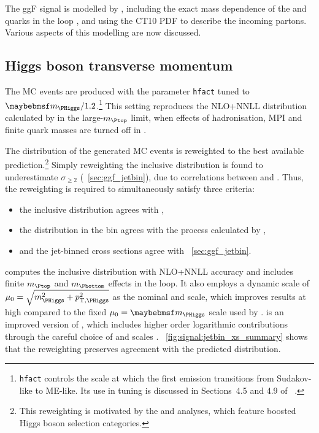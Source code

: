 
The ggF signal is modelled by , including the exact mass 
dependence of the \Ptop and \Pbottom quarks in the loop \cite{Powheg-ggF-quarkmasses}, and 
using the CT10 PDF \cite{CTEQ} to describe the incoming partons. Various aspects of this 
modelling are now discussed.



\subsection{Higgs boson transverse momentum}
\label{sec:ggF:pt}

The MC events are produced with the \powhegbox parameter \verb|hfact| tuned to 
$\mH/1.2$.\footnote{
	\texttt{hfact} controls the scale at which the first emission transitions from 
	Sudakov-like to ME-like. Its use in tuning \ptH is discussed in Sections~4.5 and 4.9 of 
	\Reference~\cite{YR2}.
}
This setting reproduces the NLO+NNLL \ptH distribution calculated by \hqt \cite{HqT2} in 
the large-$m_{\Ptop}$ limit, when effects of hadronisation, MPI and finite quark masses are 
turned off in .

The \ptH distribution of the generated MC events is reweighted to the best available 
prediction.\footnote{
	This \ptH reweighting is motivated by the \HepProcess{\PHiggs \HepTo \Pphoton\Pphoton} 
	and \HepProcess{\PHiggs \HepTo \Ptau\Ptau} analyses, which feature boosted Higgs boson 
	selection categories.
}
Simply reweighting the inclusive \ptH distribution is found to underestimate $\sigma_{\geq2}$
(\cf \Section~\ref{sec:ggf_jetbin}), due to correlations between \ptH and \njets. 
Thus, the reweighting is required to simultaneously satisfy three criteria:
\begin{itemize}[noitemsep,nolistsep]
	\item the inclusive \ptH distribution agrees with \hres \cite{HRes},
	\item the \ptH distribution in the \twojet bin agrees with the 
	 process calculated by 
	 \cite{Minlo:Hjj},
	\item and the jet-binned cross sections agree with \Section~\ref{sec:ggf_jetbin}.
\end{itemize}
\hres computes the inclusive \ptH distribution with NLO+NNLL accuracy and includes finite 
$m_{\Ptop}$ and $m_{\Pbottom}$ effects in the loop. It also employs a dynamic scale of 
$\mu_0 = \sqrt{m_{\PHiggs}^2 + p_{\text{T,\PHiggs}}^2}$ as the nominal \mur and \muf scale, 
which improves results at high \ptH compared to the fixed $\mu_0 = \mH$ scale used by \hqt.
\minlo is an improved version of \powhegbox, which includes higher order logarithmic 
contributions through the careful choice of \mur and \muf scales \cite{Minlo:Hjj}. 
\Figure~\ref{fig:signal:jetbin_xs_summary} shows that the reweighting preserves agreement 
with the predicted \njets distribution.



